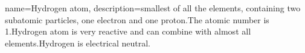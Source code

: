 { 
    name=Hydrogen atom,
    description={smallest of all the elements, containing two subatomic particles, one electron and one proton.The atomic number is 1.Hydrogen atom is very reactive and can combine with almost all elements.Hydrogen is electrical neutral.}
}
